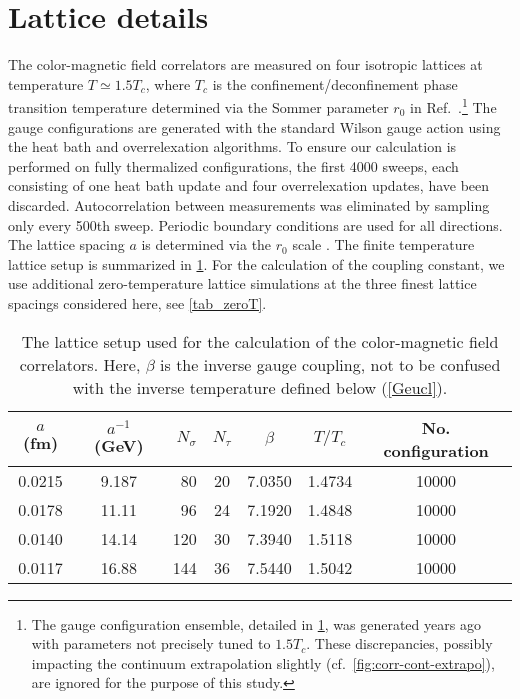 \documentclass[floatfix,twocolumn,prd,showpacs,preprintnumbers,amsmath,nofootinbib,amssymb,superscriptaddress]{revtex4-2}
\def\ccite#1{Ref.~\cite{#1}} %
\begin{document}
\section{Lattice details}
\label{sec:latt}
The color-magnetic field correlators are measured on four isotropic lattices at 
temperature $T \simeq 1.5 T_c$, where
$T_c$ is the confinement/deconfinement phase transition temperature determined via the Sommer parameter $r_0$ \cite{Sommer:1993ce} in \ccite{Francis:2015lha}.\footnote{
The gauge configuration ensemble, detailed in \cref{tab:lattice_setup}, was generated years ago with parameters not precisely tuned to $1.5 T_c$. These discrepancies, possibly impacting the continuum extrapolation slightly (cf.\ \cref{fig:corr-cont-extrapo}), are ignored for the purpose of this study.}
The gauge configurations are generated with the standard Wilson gauge action using the heat bath and overrelexation algorithms.
To ensure our calculation is performed on fully thermalized configurations, the first 4000 sweeps, each consisting of one heat bath update and four overrelexation updates, have been discarded.
Autocorrelation between measurements was eliminated by sampling only every 500th sweep.
Periodic boundary conditions are used for all directions.
The lattice spacing $a$ is determined via the $r_0$ scale \cite{Francis:2015lha, Burnier:2017bod}.
The finite temperature lattice setup is summarized in \cref{tab:lattice_setup}. For the calculation of the coupling constant, we use additional zero-temperature lattice simulations at the three finest lattice spacings considered here, see \cref{tab_zeroT}.

\begin{table}[t]       
    \centering
    \begin{tabular}{ccrcccc}                            
    \hline \hline
    $a$ (fm) & $a^{-1}$ (GeV) & $N_{\sigma}$ & $N_{\tau}$ & $\beta$ & $T/T_{c}$ & No. configuration\tabularnewline
    \hline
    0.0215 & 9.187 & 80 & 20  & 7.0350 &  1.4734  & 10000 \tabularnewline
    0.0178 & 11.11 & 96 & 24  & 7.1920 &  1.4848  & 10000 \tabularnewline
    0.0140 & 14.14 & 120 & 30  & 7.3940 &  1.5118  & 10000 \tabularnewline
    0.0117 & 16.88 & 144 & 36  & 7.5440 &  1.5042  & 10000 \tabularnewline
    \hline \hline
    \end{tabular}
    \caption{ The lattice setup used for the calculation of the color-magnetic field correlators. Here, $\beta$ is the inverse gauge coupling, not to be confused with the inverse temperature defined below (\cref{Geucl}).}
    \label{tab:lattice_setup}
\end{table}
\end{document}
